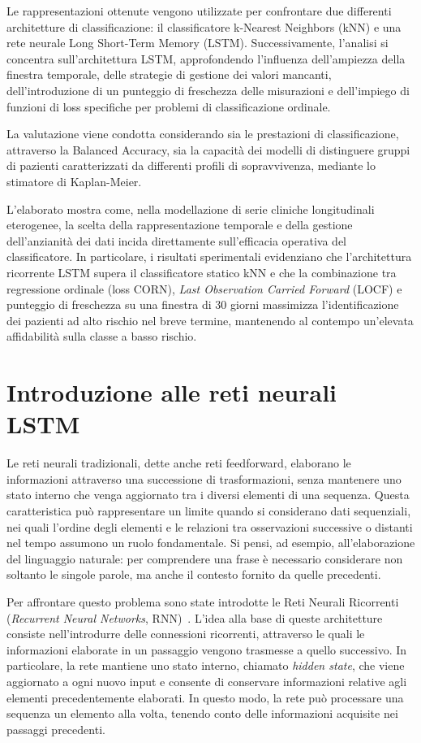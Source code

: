 \documentclass[a4paper,12pt]{report}
\begin{document}
Le rappresentazioni ottenute vengono utilizzate per confrontare due differenti architetture di classificazione: il classificatore k-Nearest Neighbors (kNN) e una rete neurale Long Short-Term Memory (LSTM). Successivamente, l'analisi si concentra sull'architettura LSTM, approfondendo l'influenza dell'ampiezza della finestra temporale, delle strategie di gestione dei valori mancanti, dell'introduzione di un punteggio di freschezza delle misurazioni e dell'impiego di funzioni di loss specifiche per problemi di classificazione ordinale.

La valutazione viene condotta considerando sia le prestazioni di classificazione, attraverso la Balanced Accuracy, sia la capacità dei modelli di distinguere gruppi di pazienti caratterizzati da differenti profili di sopravvivenza, mediante lo stimatore di Kaplan-Meier.

L'elaborato mostra come, nella modellazione di serie cliniche longitudinali eterogenee, la scelta della rappresentazione temporale e della gestione dell'anzianità dei dati incida direttamente sull'efficacia operativa del classificatore. In particolare, i risultati sperimentali evidenziano che l'architettura ricorrente LSTM supera il classificatore statico kNN e che la combinazione tra regressione ordinale (loss CORN), \textit{Last Observation Carried Forward} (LOCF) e punteggio di freschezza su una finestra di 30 giorni massimizza l'identificazione dei pazienti ad alto rischio nel breve termine, mantenendo al contempo un'elevata affidabilità sulla classe a basso rischio.

\section{Introduzione alle reti neurali LSTM}

Le reti neurali tradizionali, dette anche reti feedforward, elaborano le informazioni attraverso una successione di trasformazioni, senza mantenere uno stato interno che venga aggiornato tra i diversi elementi di una sequenza. Questa caratteristica può rappresentare un limite quando si considerano dati sequenziali, nei quali l'ordine degli elementi e le relazioni tra osservazioni successive o distanti nel tempo assumono un ruolo fondamentale. Si pensi, ad esempio, all'elaborazione del linguaggio naturale: per comprendere una frase è necessario considerare non soltanto le singole parole, ma anche il contesto fornito da quelle precedenti.

Per affrontare questo problema sono state introdotte le Reti Neurali Ricorrenti (\textit{Recurrent Neural Networks}, RNN)~\cite{RNNELMAN1990179}. L'idea alla base di queste architetture consiste nell'introdurre delle connessioni ricorrenti, attraverso le quali le informazioni elaborate in un passaggio vengono trasmesse a quello successivo. In particolare, la rete mantiene uno stato interno, chiamato \textit{hidden state}, che viene aggiornato a ogni nuovo input e consente di conservare informazioni relative agli elementi precedentemente elaborati. In questo modo, la rete può processare una sequenza un elemento alla volta, tenendo conto delle informazioni acquisite nei passaggi precedenti.
\end{document}
